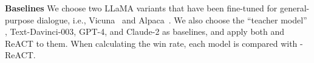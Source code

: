 \textbf{Baselines} \quad
We choose two LLaMA variants that have been fine-tuned for general-purpose dialogue, i.e., Vicuna~\citep{vicuna2023} and Alpaca~\citep{alpaca}. 
We also choose the ``teacher model'' \turbo, Text-Davinci-003, GPT-4, and Claude-2 as baselines, and apply both \dfs and ReACT to them. When calculating the win rate, each model is compared with \turbo-ReACT.


\newcommand{\femph}[1]{\cellcolor[HTML]{C5E0B4}{#1}}
\newcommand{\semph}[1]{\cellcolor[HTML]{CFE2F3}{#1}}

\newcommand{\crect}[1]{{\begin{tikzpicture}
\node[rectangle,
    draw = themeyellow,
    fill = themedarkyellow,
    inner sep=0pt,
    line width = 0.03cm,
    minimum width = #1 cm, 
    minimum height = 0.25 cm] at (0,0) {};
\end{tikzpicture}} 
}


